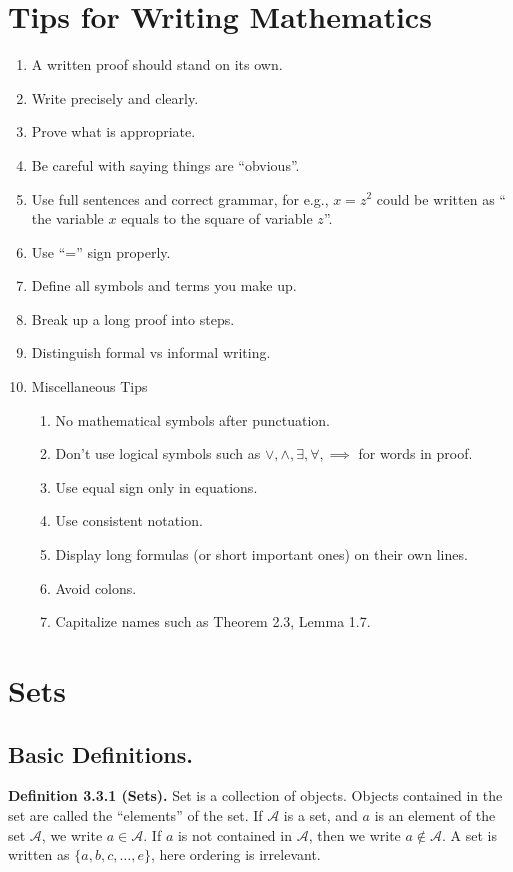 \documentclass[a4paper,10pt]{article}
\begin{document}
\section{Tips for Writing Mathematics}
\begin{enumerate}
 \item A written proof should stand on its own.
 \item Write precisely and clearly.
 \item Prove what is appropriate.
 \item Be careful with saying things are ``obvious''. 
 \item Use full sentences and correct grammar, for e.g., $x=z^2$ could be written as `` the variable $x$ equals to the square of variable $z$''.
 \item Use ``='' sign properly.
 \item Define all symbols and terms you make up. 
 \item Break up a long proof into steps. 
 \item Distinguish formal vs informal writing.
 \item Miscellaneous Tips
 \begin{enumerate}
  \item No mathematical symbols after punctuation.
  \item Don't use logical symbols such as $ \vee , \wedge ,\exists , \forall , \implies $ for words in proof.
  \item Use equal sign only in equations.
  \item Use consistent notation.
  \item Display long formulas (or short important ones) on their own lines. 
  \item Avoid colons.
  \item Capitalize names such as Theorem 2.3, Lemma 1.7.  
 \end{enumerate}
\end{enumerate}
\section{Sets}
\subsection{Basic Definitions.}
\textbf{Definition 3.3.1 (Sets).} Set is a collection of objects. Objects contained in the set are called the ``elements'' of the set. If $\mathcal{A}$ is a set, and $a$ is an element of the set $\mathcal{A}$, we write $a\in \mathcal{A}$. If $a$ is not contained in $\mathcal{A}$, then we write $a\notin\mathcal{A}$. A set is written as $\{a,b,c,\ldots,e\}$, here ordering is irrelevant. 
\end{document}
